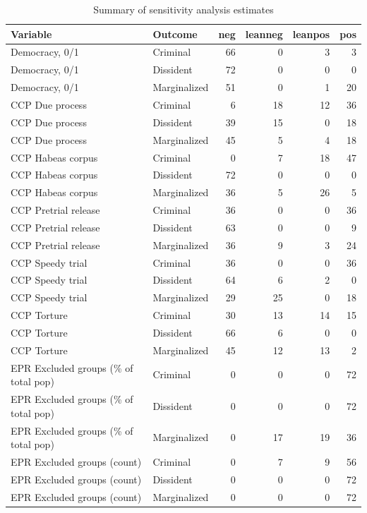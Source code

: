 \documentclass[]{article}
\begin{document}
\begin{table}[t]

\caption{\label{tab:sens}Summary of sensitivity analysis estimates}
\centering
\begin{tabular}{llrrrr}
\toprule
Variable & Outcome & neg & leanneg & leanpos & pos\\
\midrule
Democracy, 0/1 & Criminal & 66 & 0 & 3 & 3\\
Democracy, 0/1 & Dissident & 72 & 0 & 0 & 0\\
Democracy, 0/1 & Marginalized & 51 & 0 & 1 & 20\\
CCP Due process & Criminal & 6 & 18 & 12 & 36\\
CCP Due process & Dissident & 39 & 15 & 0 & 18\\
\addlinespace
CCP Due process & Marginalized & 45 & 5 & 4 & 18\\
CCP Habeas corpus & Criminal & 0 & 7 & 18 & 47\\
CCP Habeas corpus & Dissident & 72 & 0 & 0 & 0\\
CCP Habeas corpus & Marginalized & 36 & 5 & 26 & 5\\
CCP Pretrial release & Criminal & 36 & 0 & 0 & 36\\
\addlinespace
CCP Pretrial release & Dissident & 63 & 0 & 0 & 9\\
CCP Pretrial release & Marginalized & 36 & 9 & 3 & 24\\
CCP Speedy trial & Criminal & 36 & 0 & 0 & 36\\
CCP Speedy trial & Dissident & 64 & 6 & 2 & 0\\
CCP Speedy trial & Marginalized & 29 & 25 & 0 & 18\\
\addlinespace
CCP Torture & Criminal & 30 & 13 & 14 & 15\\
CCP Torture & Dissident & 66 & 6 & 0 & 0\\
CCP Torture & Marginalized & 45 & 12 & 13 & 2\\
EPR Excluded groups (\% of total pop) & Criminal & 0 & 0 & 0 & 72\\
EPR Excluded groups (\% of total pop) & Dissident & 0 & 0 & 0 & 72\\
\addlinespace
EPR Excluded groups (\% of total pop) & Marginalized & 0 & 17 & 19 & 36\\
EPR Excluded groups (count) & Criminal & 0 & 7 & 9 & 56\\
EPR Excluded groups (count) & Dissident & 0 & 0 & 0 & 72\\
EPR Excluded groups (count) & Marginalized & 0 & 0 & 0 & 72\\

\end{tabular}
\end{table}
\end{document}
